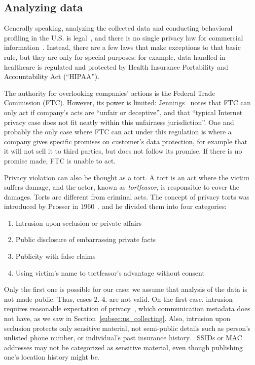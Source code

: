 \documentclass[12pt,a4paper,oneside,pdftex]{report}
\begin{document}
\subsection{Analyzing data}

Generally speaking, analyzing the collected data and conducting behavioral profiling in the U.S. is legal~\cite{jennings2012track}, and there is no single privacy law for commercial information~\cite{yeatesprivacy,jennings2012track}. Instead, there are a few laws that make exceptions to that basic rule, but they are only for special purposes: for example, data handled in healthcare is regulated and protected by Health Insurance Portability and Accountability Act (``HIPAA'').~\cite{jennings2012track}

The authority for overlooking companies' actions is the Federal Trade Commission (FTC). However, its power is limited: Jennings~\cite{jennings2012track} notes that FTC can only act if company's acts are ``unfair or deceptive'', and that ``typical Internet privacy case does not fit neatly within this unfairness jurisdiction''. One and probably the only case where FTC can act under this regulation is where a company gives specific promises on customer's data protection, for example that it will not sell it to third parties, but does not follow its promise. If there is no promise made, FTC is unable to act.~\cite{jennings2012track}

Privacy violation can also be thought as a tort. A tort is an act where the victim suffers damage, and the actor, known as \emph{tortfeasor}, is responsible to cover the damages. Torts are different from criminal acts. The concept of privacy torts was introduced by Prosser in 1960~\cite{prosser196048calif}, and he divided them into four categories:

\begin{enumerate}
    \item Intrusion upon seclusion or private affairs
    \item Public disclosure of embarrassing private facts
    \item Publicity with false claims
    \item Using victim's name to tortfeasor's advantage without consent
\end{enumerate}

Only the first one is possible for our case: we assume that analysis of the data is not made public. Thus, cases 2.-4. are not valid. On the first case, intrusion requires reasonable expectation of privacy~\cite{yeatesprivacy}, which communication metadata does not have, as we saw in Section~\ref{subsec:us_collecting}. Also, intrusion upon seclusion protects only sensitive material, not semi-public details such as person's unlisted phone number, or individual's past insurance history.~\cite{evans2012s} SSIDs or MAC addresses may not be categorized as sensitive material, even though publishing one's location history might be.
\end{document}
